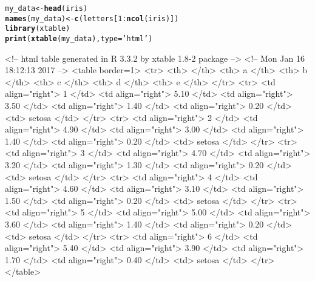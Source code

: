 \documentclass{article}\usepackage[]{graphicx}\usepackage[]{color}
\makeatletter
\newcommand{\hlnum}[1]{\textcolor[rgb]{0.686,0.059,0.569}{#1}}%
\newcommand{\hlstr}[1]{\textcolor[rgb]{0.192,0.494,0.8}{#1}}%
\newcommand{\hlopt}[1]{\textcolor[rgb]{0,0,0}{#1}}%
\newcommand{\hlstd}[1]{\textcolor[rgb]{0.345,0.345,0.345}{#1}}%
\newcommand{\hlkwb}[1]{\textcolor[rgb]{0.69,0.353,0.396}{#1}}%
\newcommand{\hlkwc}[1]{\textcolor[rgb]{0.333,0.667,0.333}{#1}}%
\newcommand{\hlkwd}[1]{\textcolor[rgb]{0.737,0.353,0.396}{\textbf{#1}}}%
\newenvironment{kframe}{%
 \def\at@end@of@kframe{}%
 \ifinner\ifhmode%
  \def\at@end@of@kframe{\end{minipage}}%
  \begin{minipage}{\columnwidth}%
 \fi\fi%
 \def\FrameCommand##1{\hskip\@totalleftmargin \hskip-\fboxsep
 \colorbox{shadecolor}{##1}\hskip-\fboxsep
     \hskip-\linewidth \hskip-\@totalleftmargin \hskip\columnwidth}%
 \MakeFramed {\advance\hsize-\width
   \@totalleftmargin\z@ \linewidth\hsize
   \@setminipage}}%
 {\par\unskip\endMakeFramed%
 \at@end@of@kframe}
\makeatother
\begin{document}
\begin{kframe}
\begin{alltt}
\hlstd{my_data} \hlkwb{<-} \hlkwd{head}\hlstd{(iris)}
\hlkwd{names}\hlstd{(my_data)} \hlkwb{<-} \hlkwd{c}\hlstd{(letters[}\hlnum{1}\hlopt{:}\hlkwd{ncol}\hlstd{(iris)])}
\hlkwd{library}\hlstd{(xtable)}
\hlkwd{print}\hlstd{(}\hlkwd{xtable}\hlstd{(my_data),} \hlkwc{type} \hlstd{=} \hlstr{'html'}\hlstd{)}
\end{alltt}
\end{kframe}<!-- html table generated in R 3.3.2 by xtable 1.8-2 package -->
<!-- Mon Jan 16 18:12:13 2017 -->
<table border=1>
<tr> <th>  </th> <th> a </th> <th> b </th> <th> c </th> <th> d </th> <th> e </th>  </tr>
  <tr> <td align="right"> 1 </td> <td align="right"> 5.10 </td> <td align="right"> 3.50 </td> <td align="right"> 1.40 </td> <td align="right"> 0.20 </td> <td> setosa </td> </tr>
  <tr> <td align="right"> 2 </td> <td align="right"> 4.90 </td> <td align="right"> 3.00 </td> <td align="right"> 1.40 </td> <td align="right"> 0.20 </td> <td> setosa </td> </tr>
  <tr> <td align="right"> 3 </td> <td align="right"> 4.70 </td> <td align="right"> 3.20 </td> <td align="right"> 1.30 </td> <td align="right"> 0.20 </td> <td> setosa </td> </tr>
  <tr> <td align="right"> 4 </td> <td align="right"> 4.60 </td> <td align="right"> 3.10 </td> <td align="right"> 1.50 </td> <td align="right"> 0.20 </td> <td> setosa </td> </tr>
  <tr> <td align="right"> 5 </td> <td align="right"> 5.00 </td> <td align="right"> 3.60 </td> <td align="right"> 1.40 </td> <td align="right"> 0.20 </td> <td> setosa </td> </tr>
  <tr> <td align="right"> 6 </td> <td align="right"> 5.40 </td> <td align="right"> 3.90 </td> <td align="right"> 1.70 </td> <td align="right"> 0.40 </td> <td> setosa </td> </tr>
   </table>

  
\end{document}
